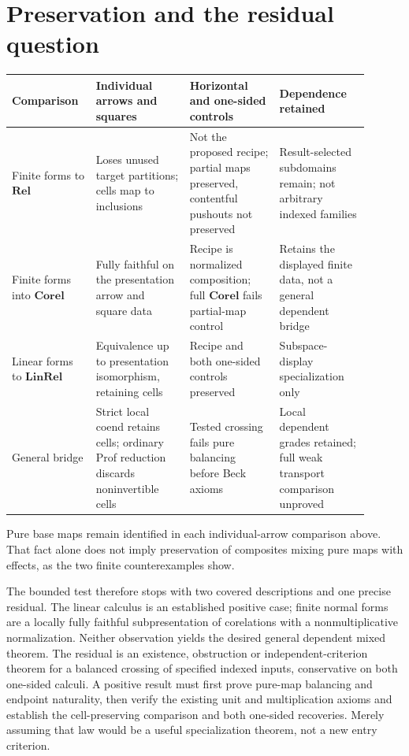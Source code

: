\documentclass[11pt,a4paper]{article}
\newcommand{\Rel}{\mathbf{Rel}}
\newcommand{\Corel}{\mathbf{Corel}}
\newcommand{\LinRel}{\mathbf{LinRel}}
\begin{document}
\section{Preservation and the residual question}

\small
\begin{longtable}{@{}p{0.20\linewidth}p{0.24\linewidth}p{0.23\linewidth}p{0.23\linewidth}@{}}
\toprule
Comparison & Individual arrows and squares & Horizontal and one-sided controls & Dependence retained \\
\midrule
\endhead
Finite forms to \(\Rel\) & Loses unused target partitions; cells map to inclusions & Not the proposed recipe; partial maps preserved, contentful pushouts not preserved & Result-selected subdomains remain; not arbitrary indexed families \\
Finite forms into \(\Corel\) & Fully faithful on the presentation arrow and square data & Recipe is normalized composition; full \(\Corel\) fails partial-map control & Retains the displayed finite data, not a general dependent bridge \\
Linear forms to \(\LinRel\) & Equivalence up to presentation isomorphism, retaining cells & Recipe and both one-sided controls preserved & Subspace-display specialization only \\
General bridge & Strict local coend retains cells; ordinary Prof reduction discards noninvertible cells & Tested crossing fails pure balancing before Beck axioms & Local dependent grades retained; full weak transport comparison unproved \\
\bottomrule
\end{longtable}
\normalsize

Pure base maps remain identified in each individual-arrow comparison above.
That fact alone does not imply preservation of composites mixing pure maps
with effects, as the two finite counterexamples show.

The bounded test therefore stops with two covered descriptions and one precise
residual. The linear calculus is an established positive case; finite normal
forms are a locally fully faithful subpresentation of corelations with a
nonmultiplicative normalization. Neither observation yields the desired general
dependent mixed theorem. The residual is an existence, obstruction or independent-criterion theorem for
a balanced crossing of specified indexed inputs, conservative on both one-sided
calculi. A positive result must first prove pure-map balancing and endpoint
naturality, then verify the existing unit and multiplication axioms and establish the
cell-preserving comparison and both one-sided recoveries. Merely assuming that
law would be a useful specialization theorem, not a new entry criterion.
\end{document}
